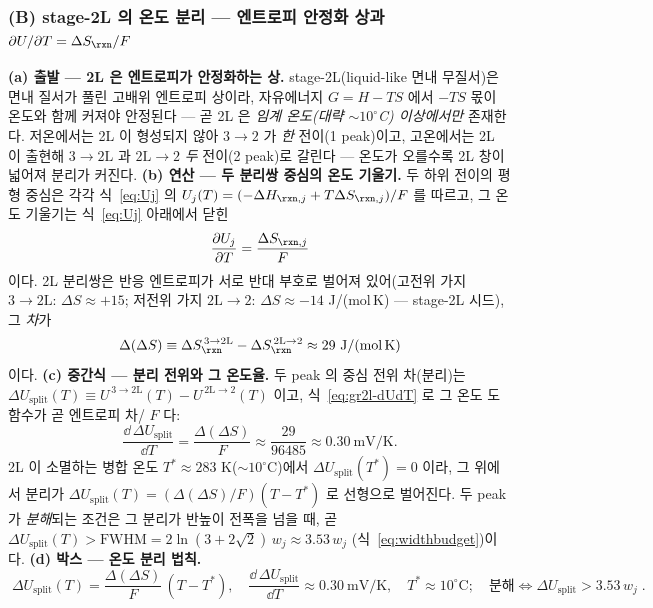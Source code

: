 \subsubsection*{(B) stage-2L 의 온도 분리 --- 엔트로피 안정화 상과 $\partial U/\partial T=\Delta S_\rxn/F$}
\textbf{(a) 출발 --- 2L 은 엔트로피가 안정화하는 상.} stage-2L($\text{liquid-like}$ 면내 무질서)은 면내 질서가
풀린 고배위 엔트로피 상이라, 자유에너지 $G=H-TS$ 에서 $-TS$ 몫이 온도와 함께 커져야 안정된다 --- 곧 2L 은
\emph{임계 온도(대략 $\sim\!10^\circ$C) 이상에서만} 존재한다\cite{dahn1991}. 저온에서는 2L 이 형성되지 않아
$3\!\to\!2$ 가 \emph{한} 전이(1 peak)이고, 고온에서는 2L 이 출현해 $3\!\to\!2\mathrm L$ 과 $2\mathrm L\!\to\!2$
\emph{두} 전이(2 peak)로 갈린다 --- 온도가 오를수록 2L 창이 넓어져 분리가 커진다.
\textbf{(b) 연산 --- 두 분리쌍 중심의 온도 기울기.} 두 하위 전이의 평형 중심은 각각 식~\eqref{eq:Uj} 의
$U_j(T)=(-\Delta H_{\rxn,j}+T\Delta S_{\rxn,j})/F$ 를 따르고, 그 온도 기울기는 식~\eqref{eq:Uj} 아래에서 닫힌
\begin{equation}
\frac{\partial U_j}{\partial T}=\frac{\Delta S_{\rxn,j}}{F}
\label{eq:gr2l-dUdT}
\end{equation}
이다. 2L 분리쌍은 반응 엔트로피가 서로 반대 부호로 벌어져 있어(고전위 가지 $3\!\to\!2\mathrm L$: $\Delta
S\approx+15$; 저전위 가지 $2\mathrm L\!\to\!2$: $\Delta S\approx-14$ J/(mol\,K) --- stage-2L 시드), 그
\emph{차}가
\begin{equation}
\Delta(\Delta S)\equiv\Delta S_{\rxn}^{\,3\to2\mathrm L}-\Delta S_{\rxn}^{\,2\mathrm L\to2}\approx29\ \mathrm{J/(mol\,K)}
\label{eq:gr2l-ddS}
\end{equation}
이다. \textbf{(c) 중간식 --- 분리 전위와 그 온도율.} 두 peak 의 중심 전위 차(분리)는
$\Delta U_\mathrm{split}(T)\equiv U^{\,3\to2\mathrm L}(T)-U^{\,2\mathrm L\to2}(T)$ 이고, 식~\eqref{eq:gr2l-dUdT}
로 그 온도 도함수가 곧 엔트로피 차/ $F$ 다:
\begin{equation}
\frac{\dd\,\Delta U_\mathrm{split}}{\dd T}=\frac{\Delta(\Delta S)}{F}\approx\frac{29}{96485}\approx0.30\ \mathrm{mV/K}.
\label{eq:gr2l-splitrate}
\end{equation}
2L 이 소멸하는 병합 온도 $T^\ast\approx283$ K($\sim\!10^\circ$C)에서 $\Delta U_\mathrm{split}(T^\ast)=0$ 이라,
그 위에서 분리가 $\Delta U_\mathrm{split}(T)=(\Delta(\Delta S)/F)(T-T^\ast)$ 로 선형으로 벌어진다. 두 peak 가
\emph{분해}되는 조건은 그 분리가 반높이 전폭을 넘을 때, 곧 $\Delta U_\mathrm{split}(T)>\mathrm{FWHM}=2\ln(3+2\sqrt2)\,w_j\approx3.53\,w_j$
(식~\eqref{eq:widthbudget})이다. \textbf{(d) 박스 --- 온도 분리 법칙.}
\begin{equation}
\boxed{\;\Delta U_\mathrm{split}(T)=\frac{\Delta(\Delta S)}{F}\,(T-T^\ast),
\quad \frac{\dd\,\Delta U_\mathrm{split}}{\dd T}\approx0.30\ \mathrm{mV/K},
\quad T^\ast\approx10^\circ\mathrm{C};
\quad \text{분해}\Leftrightarrow\Delta U_\mathrm{split}>3.53\,w_j\;.}
\label{eq:gr2l-tsplit}
\end{equation}

